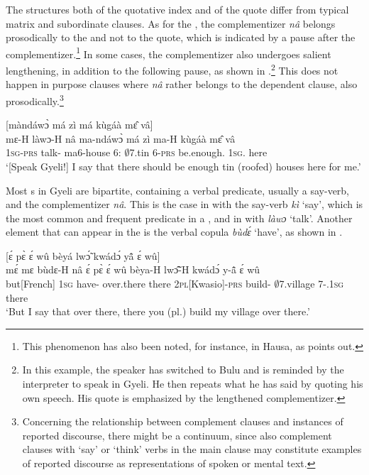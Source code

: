 The structures both of the quotative index and of the quote differ from typical matrix and subordinate clauses. As for the {\QI}, the complementizer {\itshape nâ} belongs prosodically to the {\QI} and not to the quote, which is indicated by a pause after the complementizer.\footnote{This phenomenon has also been noted, for instance, in Hausa, as \citet[236]{guldemann2008} points out.} In some cases, the complementizer also undergoes salient lengthening, in addition to the following pause, as shown in .\footnote{In this example, the speaker has switched to Bulu and is reminded by the interpreter to speak in Gyeli. He then repeats what he has said by quoting his own speech. His quote is emphasized by the lengthened complementizer.} This does not happen in purpose clauses where {\itshape nâ} rather belongs to the dependent clause, also prosodically.\footnote{Concerning the relationship between complement clauses and instances of reported discourse, there might be a continuum, since also complement clauses with `say' or `think' verbs in the main clause may constitute examples of reported discourse as representations of spoken or mental text.}



\ea\label{RS1} 
  \glll  [mɛ́ làwɔ́ {\bfseries náà}]\textsubscript{{\QI}} [màndáwɔ̀ má zì má kùgáà mɛ̂ vâ]\textsubscript{{\RD}} \\
         {\db}mɛ-H làwɔ-H nâ {\db}ma-ndáwɔ̀ má zì ma-H kùgáà mɛ̂ vâ \\
            {\db}1\textsc{sg}-\textsc{prs} talk-{\R} {\COMP} {\db}ma6-house 6:{\ATT} $\emptyset$7.tin 6-\textsc{prs} be.enough.{\SBJV} 1\textsc{sg}.{\OBJ} here \\
    \trans `[Speak Gyeli!{\textemdash}] I say that there should be enough tin (roofed) houses here for me.'
\z

Most {\QI}s in Gyeli are bipartite, containing a verbal predicate, usually a say-verb, and the complementizer {\itshape nâ}. This is the case in  with the say-verb {\itshape kì} `say', which is the most common and frequent predicate in a {\QI}, and in  with {\itshape làwɔ} `talk'. Another element that can appear in the {\QI} is the verbal copula {\itshape bùdɛ́} `have', as shown in .


\ea\label{RS2} 
  \glll  [mɛ́ mɛ̀ bùdɛ́ nâ]\textsubscript{{\QI}} [ɛ́ pɛ̀ ɛ́ wû bèyá lwɔ̃́ kwádɔ́ yã̂ ɛ́ wû]\textsubscript{{\RD}} \\
       {\db}mɛ́ mɛ bùdɛ-H nâ ɛ́ pɛ̀ {\db}ɛ́ wû bèya-H lwɔ̃̂-H kwádɔ́ y-ã̂ ɛ́ wû\\
         {\db}but[French] 1\textsc{sg} have-{\R} {\COMP} {\db}{\LOC} over.there {\LOC} there 2\textsc{pl}[Kwasio]-\textsc{prs} build-{\R} $\emptyset$7.village 7-{\POSS}.1\textsc{sg} {\LOC} there\\
    \trans `But I say that over there, there you (pl.) build my village over there.'
\z

